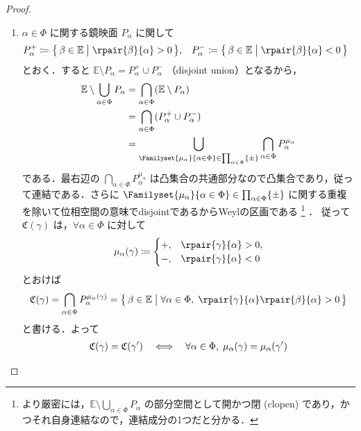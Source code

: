 \documentclass[rep_main]{subfiles}
\begin{document}
\begin{proof}
	\begin{enumerate}
		\item $\alpha \in \Phi$ に関する鏡映面 $P_\alpha$ に関して
		\begin{align}
			P_\alpha^+ &\coloneqq \bigl\{\, \beta \in \mathbb{E} \bigm| \rpair{\beta}{\alpha} > 0 \,\bigr\}, &P_\alpha^- &\coloneqq \bigl\{\, \beta \in \mathbb{E} \bigm| \rpair{\beta}{\alpha} < 0 \,\bigr\} 
		\end{align}
		とおく．すると $\mathbb{E} \setminus P_\alpha = P_\alpha^+ \cup P_\alpha^-$ （disjoint union）となるから，
		\begin{align}
			\mathbb{E} \setminus \bigcup_{\alpha \in \Phi} P_\alpha
			&= \bigcap_{\alpha \in \Phi} (\mathbb{E} \setminus P_\alpha) \\
			&= \bigcap_{\alpha \in \Phi} (P_\alpha^+ \cup P_\alpha^-) \\
			&= \bigcup_{\Familyset{\mu_\alpha}{\alpha \in \Phi} \in \prod_{\alpha \in \Phi}\{\pm\}} \bigcap_{\alpha \in \Phi} P_\alpha^{\mu_\alpha}
		\end{align}
		である．最右辺の $\bigcap_{\alpha \in \Phi} P_\alpha^{\mu_\alpha}$ は凸集合の共通部分なので凸集合であり，従って連結である．さらに $\Familyset{\mu_\alpha}{\alpha \in \Phi} \in \prod_{\alpha \in \Phi}\{\pm\}$ に関する重複を除いて位相空間の意味でdisjointであるからWeylの区画である
		\footnote{より厳密には，$\mathbb{E} \setminus \bigcup_{\alpha \in \Phi} P_\alpha$ の部分空間として開かつ閉 (clopen) であり，かつそれ自身連結なので，連結成分の1つだと分かる．}
		．
		従って $\mathfrak{C}(\gamma)$ は，$\forall \alpha \in \Phi$ に対して
		\begin{align}
			\mu_\alpha(\gamma) \coloneqq 
			\begin{cases}
				+, & \rpair{\gamma}{\alpha} > 0, \\
				-, & \rpair{\gamma}{\alpha} < 0
			\end{cases}
		\end{align}
		とおけば
		\begin{align}
			\label{eq:Weylchamber}
			\mathfrak{C}(\gamma) = \bigcap_{\alpha \in \Phi} P_\alpha^{\mu_\alpha(\gamma)} = \bigl\{\, \beta \in \mathbb{E} \bigm| \forall \alpha \in \Phi,\; \rpair{\gamma}{\alpha}\rpair{\beta}{\alpha} > 0 \,\bigr\} 
		\end{align}
		と書ける．よって
		\begin{align}
			\mathfrak{C}(\gamma) = \mathfrak{C}(\gamma') 
			&\IFF \forall \alpha \in \Phi,\; \mu_\alpha(\gamma) = \mu_\alpha(\gamma') \\

\end{align}
\end{enumerate}
\end{proof}
\end{document}
